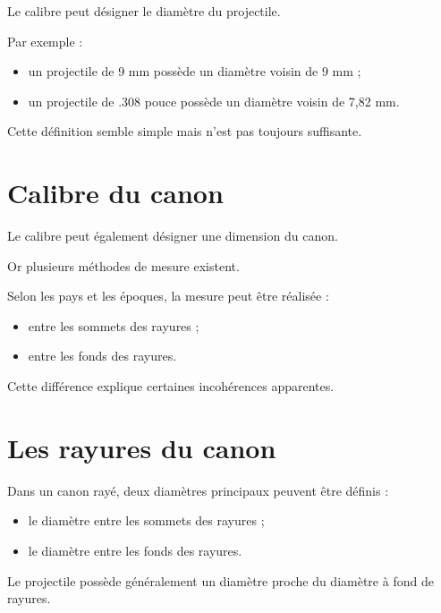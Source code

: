 Le calibre peut désigner le diamètre du projectile.

Par exemple :

\begin{itemize}
    \item un projectile de 9 mm possède un diamètre voisin de 9 mm ;
    \item un projectile de .308 pouce possède un diamètre voisin de
          7,82 mm.
\end{itemize}

Cette définition semble simple mais n'est pas toujours suffisante.

\section{Calibre du canon}

Le calibre peut également désigner une dimension du canon.

Or plusieurs méthodes de mesure existent.

Selon les pays et les époques, la mesure peut être réalisée :

\begin{itemize}
    \item entre les sommets des rayures ;
    \item entre les fonds des rayures.
\end{itemize}

Cette différence explique certaines incohérences apparentes.

\section{Les rayures du canon}

Dans un canon rayé, deux diamètres principaux peuvent être définis :

\begin{itemize}
    \item le diamètre entre les sommets des rayures ;
    \item le diamètre entre les fonds des rayures.
\end{itemize}

Le projectile possède généralement un diamètre proche du diamètre à fond de
rayures.



